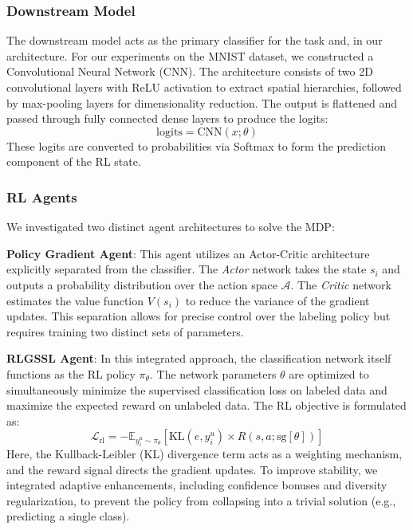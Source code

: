 \documentclass[pdflatex,sn-mathphys-num]{sn-jnl}%
\theoremstyle{thmstyleone}%
\theoremstyle{thmstyletwo}%
\theoremstyle{thmstylethree}%
\begin{document}
\subsubsection{Downstream Model}
The downstream model acts as the primary classifier for the task and, in our architecture. For our experiments on the MNIST dataset, we constructed a Convolutional Neural Network (CNN). The architecture consists of two 2D convolutional layers with ReLU activation to extract spatial hierarchies, followed by max-pooling layers for dimensionality reduction. The output is flattened and passed through fully connected dense layers to produce the logits:
\begin{equation}
\text{logits} = \text{CNN}(x; \theta)
\end{equation}
These logits are converted to probabilities via Softmax to form the prediction component of the RL state.

\subsubsection{RL Agents}
We investigated two distinct agent architectures to solve the MDP:

\textbf{Policy Gradient Agent}: This agent utilizes an Actor-Critic architecture explicitly separated from the classifier. The \textit{Actor} network takes the state $s_i$ and outputs a probability distribution over the action space $\mathcal{A}$. The \textit{Critic} network estimates the value function $V(s_i)$ to reduce the variance of the gradient updates. This separation allows for precise control over the labeling policy but requires training two distinct sets of parameters.

\textbf{RLGSSL Agent}: In this integrated approach, the classification network itself functions as the RL policy $\pi_\theta$. The network parameters $\theta$ are optimized to simultaneously minimize the supervised classification loss on labeled data and maximize the expected reward on unlabeled data. The RL objective is formulated as:
\begin{equation}
\mathcal{L}_{\text{rl}} = -\mathbb{E}_{y_i^u \sim \pi_\theta} [\text{KL}(e, y_i^u) \times R(s,a;\text{sg}[\theta])]
\end{equation}
Here, the Kullback-Leibler (KL) divergence term acts as a weighting mechanism, and the reward signal directs the gradient updates. To improve stability, we integrated adaptive enhancements, including confidence bonuses and diversity regularization, to prevent the policy from collapsing into a trivial solution (e.g., predicting a single class).
\end{document}
